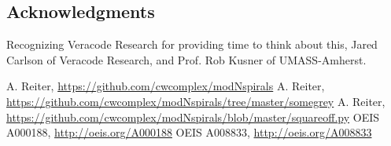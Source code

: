 \documentclass[11pt]{amsart}
\theoremstyle{mydef}
\begin{document}
\subsection{Acknowledgments}
Recognizing Veracode Research for providing time to think about this, Jared Carlson of Veracode Research, and Prof. Rob Kusner of UMASS-Amherst.

\begin{thebibliography}{1}
 A. Reiter, \url{https://github.com/cwcomplex/modNspirals}
 A. Reiter, \url{https://github.com/cwcomplex/modNspirals/tree/master/somegrey}
 A. Reiter, \url{https://github.com/cwcomplex/modNspirals/blob/master/squareoff.py}
 OEIS A000188, \url{http://oeis.org/A000188}
 OEIS A008833, \url{http://oeis.org/A008833}

\end{thebibliography}
\end{document}
